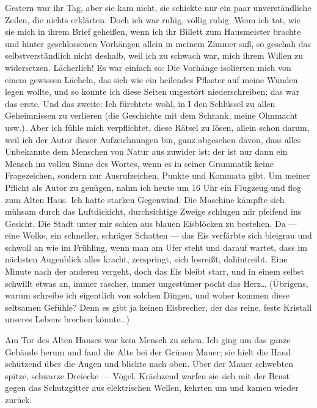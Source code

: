 Gestern war ihr Tag, aber sie kam nicht, sie schickte nur ein paar
unverständliche Zeilen, die nichts erklärten. Doch ich war ruhig,
völlig ruhig. Wenn ich tat, wie sie mich in ihrem Brief geheißen,
wenn ich ihr Billett zum Hausmeister brachte und hinter
geschlossenen Vorhängen allein in meinem Zimmer saß, so geschah das
selbstverständlich nicht deshalb, weil ich zu schwach war, mich
ihrem Willen zu widersetzen. Lächerlich! Es war einfach so: Die
Vorhänge isolierten mich von einem gewissen Lächeln, das sich wie
ein heilendes Pflaster auf meine Wunden legen wollte, und so konnte
ich diese Seiten ungestört niederschreiben; das war das erste. Und
das zweite: Ich fürchtete wohl, in I den Schlüssel zu allen
Geheimnissen zu verlieren (die Geschichte mit dem Schrank, meine
Ohnmacht usw.). Aber ich fühle mich verpflichtet, diese Rätsel zu
lösen, allein schon darum, weil ich der Autor dieser Aufzeichnungen
bin, ganz abgesehen davon, dass alles Unbekannte dem Menschen von
Natur aus zuwider ist; der  ist nur dann ein Mensch im
vollen Sinne des Wortes, wenn es in seiner Grammatik keine
Fragezeichen, sondern nur Ausrufzeichen, Punkte und Kommata gibt.
Um meiner Pflicht als Autor zu genügen, nahm ich heute um 16 Uhr
ein Flugzeug und flog zum Alten Haus. Ich hatte starken Gegenwind.
Die Maschine kämpfte sich mühsam durch das Luftdickicht,
durchsichtige Zweige schlugen mir pfeifend ins Gesicht. Die Stadt
unter mir schien aus blauen Eisblöcken zu bestehen. Da — eine
Wolke, ein schneller, schräger Schatten — das Eis verfärbte sich
bleigrau und schwoll an wie im Frühling, wenn man am Ufer steht und
darauf wartet, dass im nächsten Augenblick alles kracht,
zerspringt, sich losreißt, dahintreibt. Eine Minute nach der
anderen vergeht, doch das Eis bleibt starr, und in einem selbst
schwillt etwas an, immer rascher, immer ungestümer pocht das
Herz\ldots{} (Übrigens, warum schreibe ich eigentlich von solchen
Dingen, und woher kommen diese seltsamen Gefühle? Denn es gibt ja
keinen Eisbrecher, der das reine, feste Kristall unseres Lebens
brechen könnte\ldots{})

Am Tor des Alten Hauses war kein Mensch zu
sehen.
%
Ich ging um das ganze Gebäude herum und fand die Alte bei der
Grünen Mauer; sie hielt die Hand schützend über die Augen und
blickte nach oben. Über der Mauer schwebten spitze, schwarze
Dreiecke — Vögel. Krächzend warfen sie sich mit der Brust gegen das
Schutzgitter aus elektrischen Wellen, kehrten um und kamen wieder
zurück.

